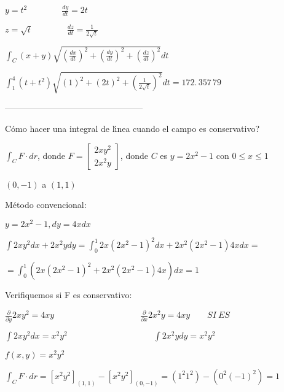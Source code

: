 \documentclass{article}
\begin{document}
$y=t^{2}\qquad \qquad \frac{dy}{dt}=2t$

$z=\sqrt{t}\qquad \qquad \frac{dz}{dt}=\frac{1}{2\sqrt{t}}$

$\int_{C}\left( x+y\right) \sqrt{\left( \frac{dx}{dt}\right) ^{2}+\left( 
\frac{dy}{dt}\right) ^{2}+\left( \frac{dz}{dt}\right) ^{2}}dt$

$\int_{1}^{4}\left( t+t^{2}\right) \sqrt{\left( 1\right) ^{2}+\left(
2t\right) ^{2}+\left( \frac{1}{2\sqrt{t}}\right) ^{2}}dt=\allowbreak
172.\,\allowbreak 357\,79\allowbreak $

------------------------------------------------

\textquestiondown C\'{o}mo hacer una integral de l\'{\i}nea cuando el campo
es conservativo?

$\int_{C}F\cdot dr$, donde $F=\left[ 
\begin{array}{c}
2xy^{2} \\ 
2x^{2}y%
\end{array}%
\right] $, donde $C$ es $y=2x^{2}-1$ con $0\leq x\leq 1$

$\left( 0,-1\right) $ a $\left( 1,1\right) $

M\'{e}todo convencional:

$y=2x^{2}-1,dy=4xdx$

$\int 2xy^{2}dx+2x^{2}ydy=\int_{0}^{1}2x\left( 2x^{2}-1\right)
^{2}dx+2x^{2}\left( 2x^{2}-1\right) 4xdx=$

$=\int_{0}^{1}\left( 2x\left( 2x^{2}-1\right) ^{2}+2x^{2}\left(
2x^{2}-1\right) 4x\right) dx=\allowbreak 1$

Verifiquemos si F es conservativo:

$\frac{\partial }{\partial y}2xy^{2}=\allowbreak 4xy\qquad \qquad \qquad
\qquad \qquad \frac{\partial }{\partial x}2x^{2}y=\allowbreak 4xy\qquad SI\
ES$

$\int 2xy^{2}dx=\allowbreak x^{2}y^{2}\qquad \qquad \qquad \qquad \qquad
\int 2x^{2}ydy=\allowbreak x^{2}y^{2}$

$f\left( x,y\right) =x^{2}y^{2}$

$\int_{C}F\cdot dr=\left[ x^{2}y^{2}\right] _{\left( 1,1\right) }-\left[
x^{2}y^{2}\right] _{\left( 0,-1\right) }=\left( 1^{2}1^{2}\right) -\left(
0^{2}\left( -1\right) ^{2}\right) =\allowbreak 1$
\end{document}

